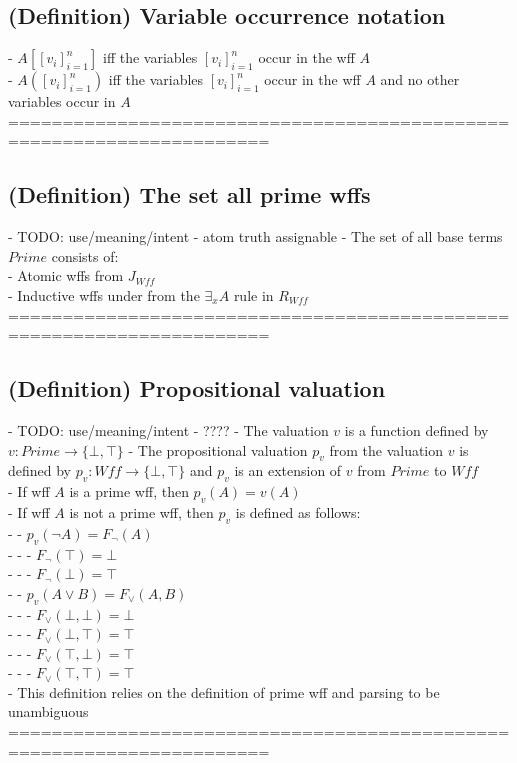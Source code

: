 \documentclass{article}
\begin{document}
\subsection{(Definition) Variable occurrence notation}
	- $A[[v_i]_{i=1}^n]$ iff the variables $[v_i]_{i=1}^n$ occur in the wff $A$ \\
	- $A([v_i]_{i=1}^n)$ iff the variables $[v_i]_{i=1}^n$ occur in the wff $A$ and no other variables occur in $A$ \\
	======================================================================
\subsection{(Definition) The set all prime wffs}
	- TODO: use/meaning/intent - atom truth assignable
	- The set of all base terms $Prime$ consists of: \\
		- Atomic wffs from $J_{Wff}$ \\
		- Inductive wffs under from the $\exists_x A$ rule in $R_{Wff}$ \\
	======================================================================
\subsection{(Definition) Propositional valuation}
	- TODO: use/meaning/intent - ????
	- The valuation $v$ is a function defined by $v: Prime \rightarrow \{\bot, \top\}$
	- The propositional valuation $p_v$ from the valuation $v$ is defined by $p_v: Wff \rightarrow \{\bot, \top\}$ and $p_v$ is an extension of $v$ from $Prime$ to $Wff$ \\
	- If wff $A$ is a prime wff, then $p_v(A) = v(A)$ \\
	- If wff $A$ is not a prime wff, then $p_v$ is defined as follows: \\
		- - $p_v(\lnot A) = F_\lnot(A)$ \\
			- - - $F_\lnot(\top) = \bot$ \\
			- - - $F_\lnot(\bot) = \top$ \\
		- - $p_v(A \lor B) = F_\lor(A, B)$ \\
			- - - $F_\lor(\bot, \bot) = \bot$ \\
			- - - $F_\lor(\bot, \top) = \top$ \\
			- - - $F_\lor(\top, \bot) = \top$ \\
			- - - $F_\lor(\top, \top) = \top$ \\
	- This definition relies on the definition of prime wff and parsing to be unambiguous
	======================================================================
\end{document}
